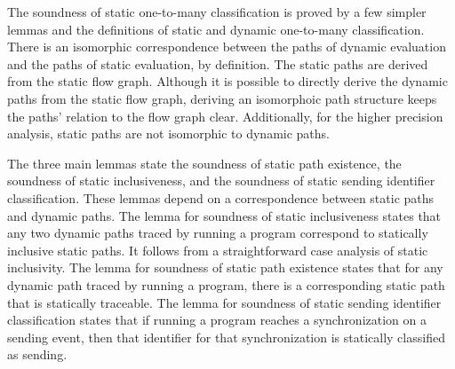 \documentclass[letterpaper, 11pt]{extarticle}
\begin{document}
The soundness of static one-to-many classification is proved by a few simpler lemmas and the
definitions of static and dynamic one-to-many classification.
There is an isomorphic correspondence between the paths of
dynamic evaluation and the paths of static evaluation, by definition.
The static paths are derived from the static flow graph. Although it is possible to directly derive
the dynamic paths from the static flow graph, deriving an isomorphoic path structure keeps the
paths' relation to the flow graph clear. Additionally, for the higher precision analysis, static
paths are not isomorphic to dynamic paths. 

The three main lemmas state the
soundness of static path existence, the soundness of static inclusiveness, and
the soundness of static sending identifier classification. These lemmas depend on a
correspondence between static paths and dynamic paths.
The lemma for soundness of static inclusiveness states that any two
dynamic paths traced by running a program correspond to statically inclusive static paths. It
follows from a straightforward case analysis of static inclusivity. The lemma for soundness of
static path existence states that for any dynamic path traced by running a program, there
is a corresponding static path that is statically traceable. The lemma for soundness of
static sending identifier classification states that if running a program reaches a
synchronization on a sending event, then that identifier for that synchronization
is statically classified as sending.
\end{document}

